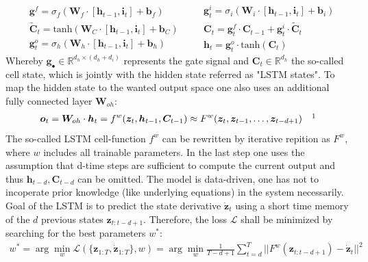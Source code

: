 \documentclass{scrarticle}
\begin{document}
	\begin{equation}
	\begin{aligned}
		&\bm{g}^f = \sigma_f(\bm{W}_f\cdot[\bm{h}_{t-1}, \bm{i}_t]+\bm{b}_f)\\
		&\tilde{\bm{C}}_t = \text{tanh}(\bm{W}_C\cdot[\bm{h}_{t-1}, \bm{i}_t]+\bm{b}_C)\\
		&\bm{g}_t^o=\sigma_h(\bm{W}_h\cdot[\bm{h}_{t-1}, \bm{i}_t]+\bm{b}_h)
	\end{aligned}
	\quad
	\begin{aligned}
		&\bm{g}_t^i=\sigma_i(\bm{W}_i\cdot[\bm{h}_{t-1}, \bm{i}_t]+\bm{b}_i)\\
		&\bm{C}_t = \bm{g}_t^f\cdot\bm{C}_{t-1} +\bm{g}_t^i\cdot\tilde{\bm{C}}_t\\
		&\bm{h}_t = \bm{g}_t^o\cdot\text{tanh}(\bm{C}_t)
	\end{aligned}
	\end{equation}
	Whereby $\bm{g}_\bullet\in\mathbb{R}^{d_h\times(d_h+d_i)}$ represents the gate signal and $\bm{C}_t\in\mathbb{R}^{d_h}$ the so-called cell state, which is jointly with the hidden state referred as "LSTM states". To map the hidden state to the wanted output space one also uses an additional fully connected layer $\bm{W}_{oh}$:
	\begin{align}
		\bm{o}_t = \bm{W}_{oh}\cdot\bm{h}_t = f^w(\bm{z}_t, \bm{h}_{t-1}, \bm{C}_{t-1}) \approx F^w(\bm{z}_t, \bm{z}_{t-1}, \hdots, \bm{z}_{t-d+1}) \quad\footnotemark
	\end{align}
	The so-called LSTM cell-function $f^w$ can be rewritten by iterative repition as $F^w$, where $w$ includes all trainable parameters. In the last step one uses the assumption that d-time steps are sufficient to compute the current output and thus $\bm{h}_{t-d},\bm{C}_{t-d}$ can be omitted. The model is data-driven, one has not to incoperate prior knowledge (like underlying equations) in the system necessarily.
	Goal of the LSTM is to predict the state derivative $\bm{\dot{z}}_t$ using a short time memory of the $d$ previous states $\bm{z}_{t:t-d+1}$. Therefore, the loss $\mathcal{L}$ shall be minimized by searching for the best parameters $w^*$:
	\begin{align}
	w^* = \arg\min_w\mathcal{L}(\{\bm{z}_{1:T},\bm{\dot{z}}_{1:T}\},w)=\arg\min_w\frac{1}{T-d+1}\sum_{t=d}^T||F^w(\bm{z}_{t:t-d+1})-\bm{\dot{z}}_t||^2
	\end{align}
\end{document}
